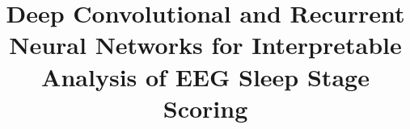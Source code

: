 \documentclass{article}
\title{Deep Convolutional and Recurrent Neural Networks for Interpretable Analysis of EEG Sleep Stage Scoring}
\begin{document}
\maketitle







%

\label{sec:ref}


\end{document}
